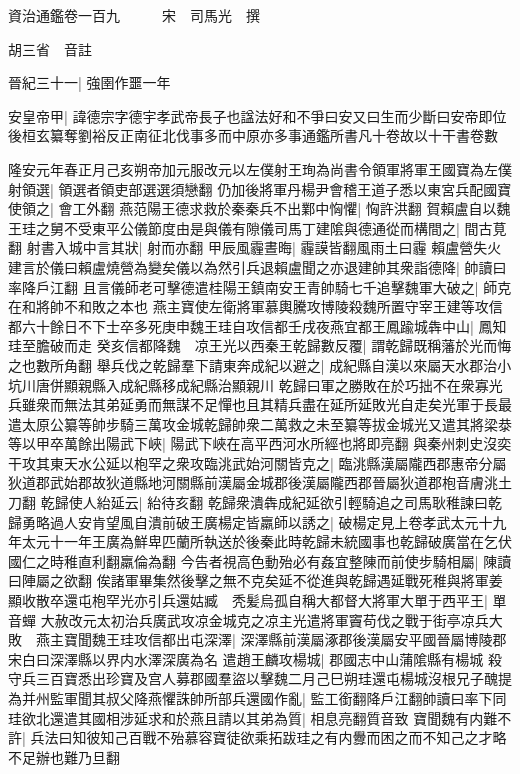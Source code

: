 資治通鑑卷一百九　　　宋　司馬光　撰

胡三省　音註

晉紀三十一|{
	強圉作噩一年}


安皇帝甲|{
	諱德宗字德宇孝武帝長子也諡法好和不爭曰安又曰生而少斷曰安帝即位後桓玄纂奪劉裕反正南征北伐事多而中原亦多事通鑑所書凡十卷故以十干書卷數}


隆安元年春正月己亥朔帝加元服改元以左僕射王珣為尚書令領軍將軍王國寶為左僕射領選|{
	領選者領吏部選選須戀翻}
仍加後將軍丹楊尹會稽王道子悉以東宮兵配國寶使領之|{
	會工外翻}
燕范陽王德求救於秦秦兵不出鄴中恟懼|{
	恟許洪翻}
賀賴盧自以魏王珪之舅不受東平公儀節度由是與儀有隙儀司馬丁建隂與德通從而構間之|{
	間古莧翻}
射書入城中言其狀|{
	射而亦翻}
甲辰風霾晝晦|{
	霾謨皆翻風雨土曰霾}
賴盧營失火建言於儀曰賴盧燒營為變矣儀以為然引兵退賴盧聞之亦退建帥其衆詣德降|{
	帥讀曰率降戶江翻}
且言儀師老可擊德遣桂陽王鎮南安王青帥騎七千追擊魏軍大破之|{
	師克在和將帥不和敗之本也}
燕主寶使左衛將軍慕輿騰攻博陵殺魏所置守宰王建等攻信都六十餘日不下士卒多死庚申魏王珪自攻信都壬戌夜燕宜都王鳳踰城犇中山|{
	鳳知珪至膽破而走}
癸亥信都降魏　凉王光以西秦王乾歸數反覆|{
	謂乾歸既稱藩於光而悔之也數所角翻}
舉兵伐之乾歸羣下請東奔成紀以避之|{
	成紀縣自漢以來屬天水郡治小坑川唐併顯親縣入成紀縣移成紀縣治顯親川}
乾歸曰軍之勝敗在於巧拙不在衆寡光兵雖衆而無法其弟延勇而無謀不足憚也且其精兵盡在延所延敗光自走矣光軍于長最遣太原公纂等帥步騎三萬攻金城乾歸帥衆二萬救之未至纂等拔金城光又遣其將梁㳟等以甲卒萬餘出陽武下峽|{
	陽武下峽在高平西河水所經也將即亮翻}
與秦州刺史沒奕干攻其東天水公延以枹罕之衆攻臨洮武始河關皆克之|{
	臨洮縣漢屬隴西郡惠帝分屬狄道郡武始郡故狄道縣地河關縣前漢屬金城郡後漢屬隴西郡晉屬狄道郡枹音膚洮土刀翻}
乾歸使人紿延云|{
	紿待亥翻}
乾歸衆潰犇成紀延欲引輕騎追之司馬耿稚諫曰乾歸勇略過人安肯望風自潰前破王廣楊定皆羸師以誘之|{
	破楊定見上卷孝武太元十九年太元十一年王廣為鮮卑匹蘭所執送於後秦此時乾歸未統國事也乾歸破廣當在乞伏國仁之時稚直利翻羸倫為翻}
今告者視高色動殆必有姦宜整陳而前使步騎相屬|{
	陳讀曰陣屬之欲翻}
俟諸軍畢集然後擊之無不克矣延不從進與乾歸遇延戰死稚與將軍姜顯收散卒還屯枹罕光亦引兵還姑臧　秃髪烏孤自稱大都督大將軍大單于西平王|{
	單音蟬}
大赦改元太初治兵廣武攻凉金城克之凉主光遣將軍竇苟伐之戰于街亭凉兵大敗　燕主寶聞魏王珪攻信都出屯深澤|{
	深澤縣前漢屬涿郡後漢屬安平國晉屬博陵郡宋白曰深澤縣以界内水澤深廣為名}
遣趙王麟攻楊城|{
	郡國志中山蒲隂縣有楊城}
殺守兵三百寶悉出珍寶及宫人募郡國羣盜以擊魏二月己巳朔珪還屯楊城沒根兄子醜提為并州監軍聞其叔父降燕懼誅帥所部兵還國作亂|{
	監工銜翻降戶江翻帥讀曰率下同}
珪欲北還遣其國相涉延求和於燕且請以其弟為質|{
	相息亮翻質音致}
寶聞魏有内難不許|{
	兵法曰知彼知己百戰不殆慕容寶徒欲乘拓跋珪之有内釁而困之而不知己之才略不足辦也難乃旦翻}
